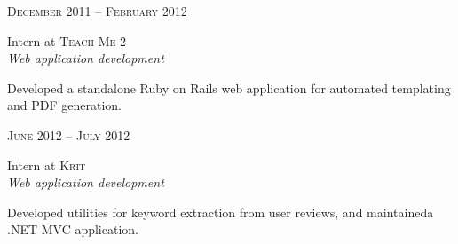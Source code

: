 \documentclass[a4paper,10pt]{article} %
\begin{document}
\begin{minipage}[t]{0.44\textwidth}

{\raggedleft\textsc{December 2011 -- February 2012}\par}

{\raggedright\large Intern at \textsc{Teach Me 2}\\
\textit{Web application development}\\[5pt]}

\normalsize{Developed a standalone Ruby on Rails web application for automated templating and PDF generation.}\\


{\raggedleft\textsc{June 2012 -- July 2012}\par}

{\raggedright\large Intern at \textsc{Krit}\\
\textit{Web application development}\\[5pt]}

\normalsize{Developed utilities for keyword extraction from user reviews, and maintaineda .NET MVC application.}\\


\end{minipage} %
\end{document}
